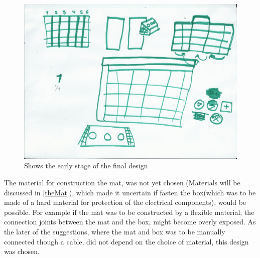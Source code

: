 \begin{figure}[H]
	\centering
	\includegraphics[width=0.7\linewidth]{figure/Design/sketchOne}
	\caption{Shows the early stage of the final design}
	\label{fig:matVsBox}
\end{figure} 

The material for construction the mat, was not yet chosen (Materials will be discussed in \autoref{theMat}), which made it uncertain if fasten the box(which was to be made of a hard material for protection of the electrical components), would be possible. For example if the mat was to be constructed by a flexible material, the connection joints between the mat and the box, might become overly exposed.
As the later of the suggestions, where the mat and box was to be manually connected though a cable, did not depend on the choice of material, this design was chosen. 


